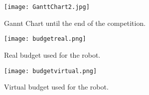 \begin{figure}[H]
  \centering
  \texttt{[image: GanttChart2.jpg]}
  \caption{Gannt Chart until the end of the competition.}
\label{fig:gannt2}
\end{figure}

\begin{figure}[H]
  \centering
  \texttt{[image: budgetreal.png]}
  \caption{Real budget used for the robot.}
\label{fig:real}
\end{figure}

\begin{figure}[H]
  \centering
  \texttt{[image: budgetvirtual.png]}
  \caption{Virtual budget used for the robot.}
\label{fig:virtual}
\end{figure}